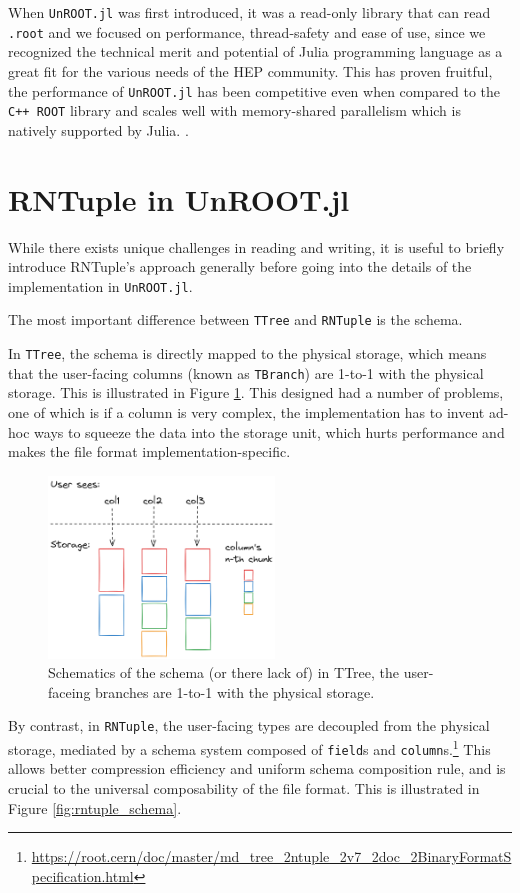 \documentclass{juliacon}
\begin{document}
When \verb|UnROOT.jl| was first introduced, it was a read-only library that can read \verb|.root|
and we focused on performance, thread-safety and ease of use, since we recognized the technical
merit and potential of Julia programming language as a great fit for the various needs of the HEP
community. This has proven fruitful, the performance of \verb|UnROOT.jl| has been competitive even
when compared to the \verb|C++ ROOT| library and scales well with memory-shared parallelism which is
natively supported by Julia.
\cite{chep_2023}.

\section{RNTuple in UnROOT.jl}
While there exists unique challenges in reading and writing, it is useful to briefly introduce
RNTuple's approach generally before going into the details of the implementation in
\verb|UnROOT.jl|. 

The most important difference between \verb|TTree| and \verb|RNTuple| is the schema.

In
\verb|TTree|, the schema is directly mapped to the physical storage, which means that the
user-facing columns (known as \verb|TBranch|) are 1-to-1 with the physical storage. This is
illustrated in Figure \ref{fig:ttree_schema}. This designed had a number of problems, one of which
is if a column is very complex, the implementation has to invent ad-hoc ways to squeeze the data
into the storage unit, which hurts performance and makes the file format 
implementation-specific.


\begin{figure}[h]
\centerline{\includegraphics[width=6cm]{ttree_schema.png}}
\caption{Schematics of the schema (or there lack of) in TTree, the user-faceing branches are 1-to-1
with the physical storage.}
	\label{fig:ttree_schema}
\end{figure}

By contrast, in \verb|RNTuple|, the user-facing types are decoupled from the physical storage,
mediated by a schema system composed of \verb|field|s and
\verb|column|s.\footnote{\url{https://root.cern/doc/master/md_tree_2ntuple_2v7_2doc_2BinaryFormatSpecification.html}}
This allows better compression efficiency and uniform schema composition rule, and is crucial to the
universal composability of the file format. This is illustrated in Figure \ref{fig:rntuple_schema}.
\end{document}
